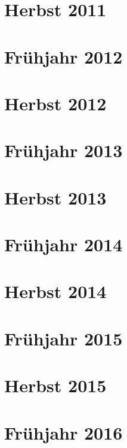 \documentclass{lehramt-informatik-examen-sammlung}
\begin{document}
\section{Herbst 2011}


\section{Frühjahr 2012}


\section{Herbst 2012}


\section{Frühjahr 2013}


\section{Herbst 2013}


\section{Frühjahr 2014}


\section{Herbst 2014}


\section{Frühjahr 2015}


\section{Herbst 2015}


\section{Frühjahr 2016}

\end{document}
